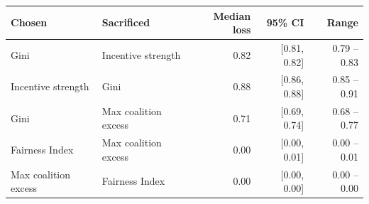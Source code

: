 \begin{tabular}{llrrr}
\toprule
Chosen & Sacrificed & Median loss & 95\% CI & Range \\
\midrule
Gini & Incentive strength & 0.82 & [0.81, 0.82] & 0.79 -- 0.83 \\
Incentive strength & Gini & 0.88 & [0.86, 0.88] & 0.85 -- 0.91 \\
Gini & Max coalition excess & 0.71 & [0.69, 0.74] & 0.68 -- 0.77 \\
Fairness Index & Max coalition excess & 0.00 & [0.00, 0.01] & 0.00 -- 0.01 \\
Max coalition excess & Fairness Index & 0.00 & [0.00, 0.00] & 0.00 -- 0.00 \\
\bottomrule
\end{tabular}
